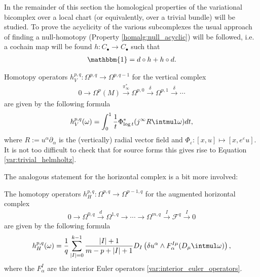     In the remainder of this section the homological properties of the variational bicomplex over a local chart (or equivalently, over a trivial bundle) will be studied. To prove the acyclicity of the various subcomplexes the usual approach of finding a null-homotopy (Property \ref{homalg:null_acyclic}) will be followed, i.e. a cochain map will be found $h:C_\bullet\rightarrow C_\bullet$ such that
    \begin{gather}
        \mathbbm{1} = d\circ h + h\circ d.
    \end{gather}

    \begin{property}
        Homotopy operators $h^{p,q}_V:\Omega^{p,q}\rightarrow\Omega^{p,q-1}$ for the vertical complex
        \begin{gather}
            0\longrightarrow\Omega^p(M)\overset{\pi_\infty^*}{\longrightarrow}\Omega^{p,0}\overset{\delta}{\longrightarrow}\Omega^{p,1}\overset{\delta}{\longrightarrow}\cdots
        \end{gather}
        are given by the following formula
        \begin{gather}
            h^{p,q}_V(\omega) = \int_0^1\frac{1}{t}\Phi^*_{\log t}(j^\infty R\intmul\omega)dt,
        \end{gather}
        where $R:=u^\alpha\partial_\alpha$ is the (vertically) radial vector field and $\Phi_\varepsilon:[x,u]\mapsto[x,e^\varepsilon u]$. It is not too difficult to check that for source forms this gives rise to Equation \eqref{var:trivial_helmholtz}.
    \end{property}
    The analogous statement for the horizontal complex is a bit more involved:
    \begin{property}
        The homotopy operators $h^{p,q}_H:\Omega^{p,q}\rightarrow\Omega^{p-1,q}$ for the augmented horizontal complex
        \begin{gather}
            0\longrightarrow\Omega^{0,q}\overset{d}{\longrightarrow}\Omega^{1,q}\longrightarrow\cdots\longrightarrow\Omega^{m,q}\overset{I}{\longrightarrow}\mathcal{F}^q\overset{I}{\longrightarrow}0
        \end{gather}
        are given by the following formula
        \begin{gather}
            h^{p,q}_H(\omega) = \frac{1}{q}\sum_{|I|=0}^{k-1}\frac{|I|+1}{m-p+|I|+1}D_I\left(\delta u^\alpha\wedge F^{I\mu}_\alpha(D_\mu\intmul\omega)\right),
        \end{gather}
        where the $F^I_\alpha$ are the interior Euler operators \eqref{var:interior_euler_operators}.
    \end{property}

